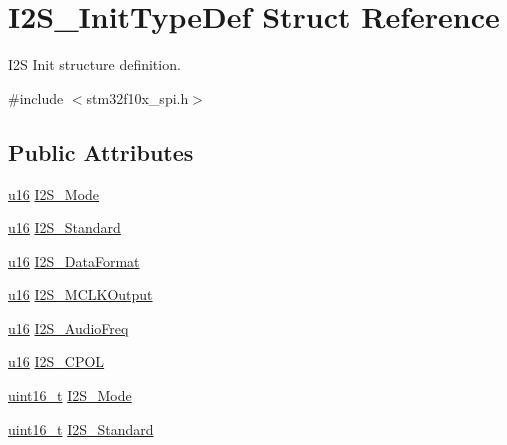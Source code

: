 \hypertarget{struct_i2_s___init_type_def}{}\section{I2\+S\+\_\+\+Init\+Type\+Def Struct Reference}
\label{struct_i2_s___init_type_def}


I2S Init structure definition.  




{\ttfamily \#include $<$stm32f10x\+\_\+spi.\+h$>$}

\subsection*{Public Attributes}
\begin{DoxyCompactItemize}
\item 
\hyperlink{agilefox_2library_2inc_2stm32f10x__type_8h_a9e6c91d77e24643b888dbd1a1a590054}{u16} \hyperlink{struct_i2_s___init_type_def_affa4174dccf057c2ff09fa0d3a39f0ef}{I2\+S\+\_\+\+Mode}
\item 
\hyperlink{agilefox_2library_2inc_2stm32f10x__type_8h_a9e6c91d77e24643b888dbd1a1a590054}{u16} \hyperlink{struct_i2_s___init_type_def_a21c487143d1264cd51ca566bc63fcb55}{I2\+S\+\_\+\+Standard}
\item 
\hyperlink{agilefox_2library_2inc_2stm32f10x__type_8h_a9e6c91d77e24643b888dbd1a1a590054}{u16} \hyperlink{struct_i2_s___init_type_def_a54330aab69acdb50db8607c1d1e4738d}{I2\+S\+\_\+\+Data\+Format}
\item 
\hyperlink{agilefox_2library_2inc_2stm32f10x__type_8h_a9e6c91d77e24643b888dbd1a1a590054}{u16} \hyperlink{struct_i2_s___init_type_def_a58b89fa9268a9cfd443d3ab9dd638934}{I2\+S\+\_\+\+M\+C\+L\+K\+Output}
\item 
\hyperlink{agilefox_2library_2inc_2stm32f10x__type_8h_a9e6c91d77e24643b888dbd1a1a590054}{u16} \hyperlink{struct_i2_s___init_type_def_aa73d0e4685a8ead6dcd14cba79bcb6ee}{I2\+S\+\_\+\+Audio\+Freq}
\item 
\hyperlink{agilefox_2library_2inc_2stm32f10x__type_8h_a9e6c91d77e24643b888dbd1a1a590054}{u16} \hyperlink{struct_i2_s___init_type_def_a80e9c3ee7980d1b0905a228b3f49e9d3}{I2\+S\+\_\+\+C\+P\+OL}
\item 
\hyperlink{_p_e___types_8h_a1f1825b69244eb3ad2c7165ddc99c956}{uint16\+\_\+t} \hyperlink{struct_i2_s___init_type_def_aa57e5190eac245c0873a00849b1bd239}{I2\+S\+\_\+\+Mode}
\item 
\hyperlink{_p_e___types_8h_a1f1825b69244eb3ad2c7165ddc99c956}{uint16\+\_\+t} \hyperlink{struct_i2_s___init_type_def_ae987936e7cb9a962ee388c98f8c872b7}{I2\+S\+\_\+\+Standard}

\end{DoxyCompactItemize}
